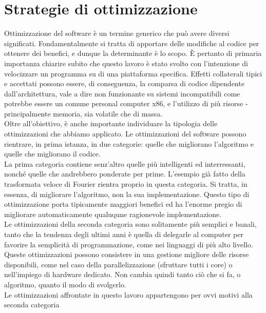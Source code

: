 
\section{Strategie di ottimizzazione}
Ottimizzazione del software è un termine generico che può avere diversi 
significati. Fondamentalmente si tratta di apportare delle modifiche al codice 
per ottenere dei benefici, e dunque la determinante è lo scopo. \`E pertanto di 
primaria importanza chiarire subito che 
questo lavoro è stato svolto con l'intenzione di velocizzare un programma su 
di una piattaforma specifica. Effetti collaterali tipici e accettati possono 
essere, di conseguenza, la comparsa di codice dipendente dall'architettura, 
vale a dire non funzionante su sistemi incompatibili come potrebbe essere un 
comune 
personal computer x86, e l'utilizzo di più risorse - principalmente memoria, 
sia volatile che di massa. \\
Oltre all'obiettivo, è anche importante individuare la tipologia delle 
ottimizzazioni 
che abbiamo applicato. Le ottimizzazioni del software possono 
rientrare, in prima istanza, in due 
categorie: quelle che migliorano l'algoritmo e quelle che migliorano il codice. 
\\La prima categoria contiene senz'altro quelle più intelligenti ed 
interressanti, nonché quelle che andrebbero ponderate per prime. L'esempio già 
fatto della trasformata veloce di Fourier rientra proprio in questa categoria. 
Si tratta, in essenza, di migliorare l'algoritmo, non la sua implementazione.
Questo tipo di ottimizzazione porta tipicamente maggiori benefici ed ha 
l'enorme pregio di migliorare automaticamente qualuqune ragionevole 
implementazione.
\\Le ottimizzazioni della seconda categoria sono solitamente più semplici e 
banali, tanto che la tendenza degli ultimi anni è quella di delegarle al 
computer per favorire la semplicità di programmazione, come nei linguaggi di 
più alto livello. Queste ottimizzazioni possono consistere in una gestione 
migliore delle risorse disponibili, come nel caso della parallelizzazione 
(sfruttare tutti i core) o nell'impiego di hardware dedicato.
Non cambia quindi tanto ciò che si fa, o algoritmo, quanto il modo di 
svolgerlo.\\
Le ottimizzazioni affrontate in questo lavoro appartengono per ovvi motivi alla 
seconda categoria

